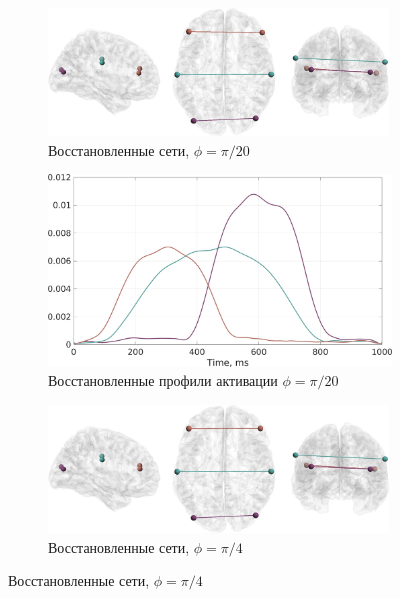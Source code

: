\begin{figure}[htbp]
    \begin{subfigure}[t]{0.6\textwidth}
        \includegraphics[width=0.99\textwidth]{../images/networks_gopsiicos.jpg}
        \caption{Восстановленные сети, $\phi=\pi/20$}\label{fig:gopsiicos_a}
    \end{subfigure}
    \begin{subfigure}[t]{0.4\textwidth}
        \includegraphics[width=0.99\linewidth]{../images/timeseries_gopsiicos.jpg}
        \caption{Восстановленные профили активации $\phi=\pi/20$}\label{fig:gopsiicos_b}
    \end{subfigure}
    \begin{subfigure}[t]{0.6\textwidth}
        \includegraphics[width=0.99\textwidth]{../images/networks_gopsiicos_pi4.jpg}
        \caption{Восстановленные сети, $\phi=\pi/4$}\label{fig:gopsiicos_c}

\end{subfigure}
\end{figure}

